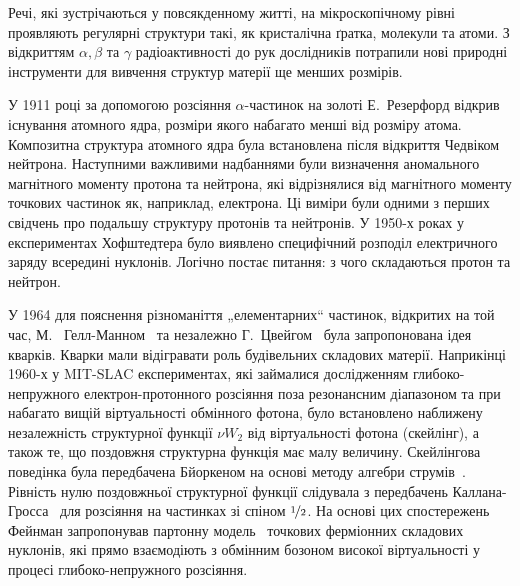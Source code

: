 Речі, які зустрічаються у повсякденному житті, на мікроскопічному рівні проявляють регулярні структури такі, як кристалічна ґратка, молекули та атоми. З відкриттям $\alpha,\beta$ та $\gamma$ радіоактивності до рук дослідників потрапили нові природні інструменти для вивчення структур матерії ще менших розмірів.

У 1911 році за допомогою розсіяння $\alpha$-частинок на золоті Е.~Резерфорд відкрив існування атомного ядра, розміри якого набагато менші від розміру атома. Композитна структура атомного ядра була встановлена після відкриття Чедвіком нейтрона. Наступними важливими надбаннями були визначення аномального магнітного моменту протона та нейтрона, які відрізнялися від магнітного моменту точкових частинок як, наприклад, електрона. Ці виміри були одними з перших свідчень про подальшу структуру протонів та нейтронів. У 1950-х роках у експериментах Хофштедтера було виявлено специфічний розподіл електричного заряду всередині нуклонів. Логічно постає питання: з чого складаються протон та нейтрон.

У 1964 для пояснення різноманіття „елементарних“ частинок, відкритих на той час, М.~ Гелл-Манном~\cite{GellMann:1964nj} та незалежно Г.~Цвейгом~\cite{Zweig:1964jf} була запропонована ідея кварків. Кварки мали відігравати роль будівельних складових матерії. Наприкінці 1960-х у MIT-SLAC експериментах, які займалися дослідженням глибоко-непружного електрон-протонного розсіяння поза резонансним діапазоном та при набагато вищій віртуальності обмінного фотона, було встановлено наближену незалежність структурної функції $\nu W_2$ від віртуальності фотона (скейлінг), а також те, що поздовжня структурна функція має малу величину. Скейлінгова поведінка була передбачена Бйоркеном на основі методу алгебри струмів~\cite{Bjorken:1968dy}. Рівність нулю поздовжньої структурної функції слідувала з передбачень Каллана-Гросса~\cite{Callan:1969uq} для розсіяння на частинках зі спіном $\nicefrac{1}{2}$. На основі цих спостережень Фейнман запропонував партонну модель~\cite{Feynman:1969ej} точкових ферміонних складових нуклонів, які прямо взаємодіють з обмінним бозоном високої віртуальності у процесі глибоко-непружного розсіяння.

